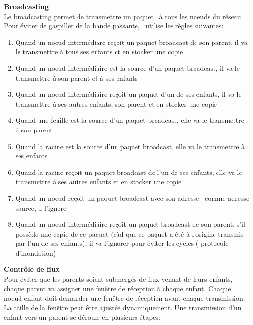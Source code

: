        \vspace{0.5cm}
        \textbf{Broadcasting}\\
            Le broadcasting permet de transmettre un paquet \espmesh\ à tous les noeuds du réseau. Pour éviter de gaspiller de
            la bande passante, \espmesh\ utilise les règles suivantes:
            \begin{enumerate}
                \item Quand un noeud intermédiare reçoit un paquet broadcast de son parent, il va le transmettre à tous ses enfants
                    et en stocker une copie
                \item Quand un noeud intermédiaire est la source d'un paquet broadcast, il va le transmettre à son parent et à ses enfants
                \item Quand un noeud intermédiaire reçoit un paquet d'un de ses enfants, il va le transmettre à ses autres enfants, son parent
                    et en stocker une copie
                \item Quand une feuille est la source d'un paquet broadcast, elle va le transmettre à son parent
                \item Quand la racine est la source d'un paquet broadcast, elle va le transmettre à ses enfants
                \item Quand la racine reçoit un paquet broadcast de l'un de ses enfants, elle va le transmettre à ses autres enfants et en stocker une copie
                \item Quand un noeud reçoit un paquet broadcast avec son adresse \mac\ comme adresse source, il l'ignore
                \item Quand un noeud intermédiaire reçoit un paquet broadcast de son parent, s'il possède une copie de ce paquet (càd que ce paquet a été à l'origine transmis par l'un de ses enfants), il va l'ignorer
                    pour éviter les cycles ( protocole d'inondation)
            \end{enumerate}
        \vspace{0.5cm}
        \textbf{Contrôle de flux}\\%
            Pour éviter que les parents soient submergés de flux venant de leurs enfants, chaque parent va
            assigner une fenêtre de réception à chaque enfant. Chaque noeud enfant doit demander une fenêtre
            de réception avant chaque transmission. La taille de la fenêtre peut être ajustée dynamiquement.
            Une transmission d'un enfant vers un parent se déroule en plusieurs étapes:
